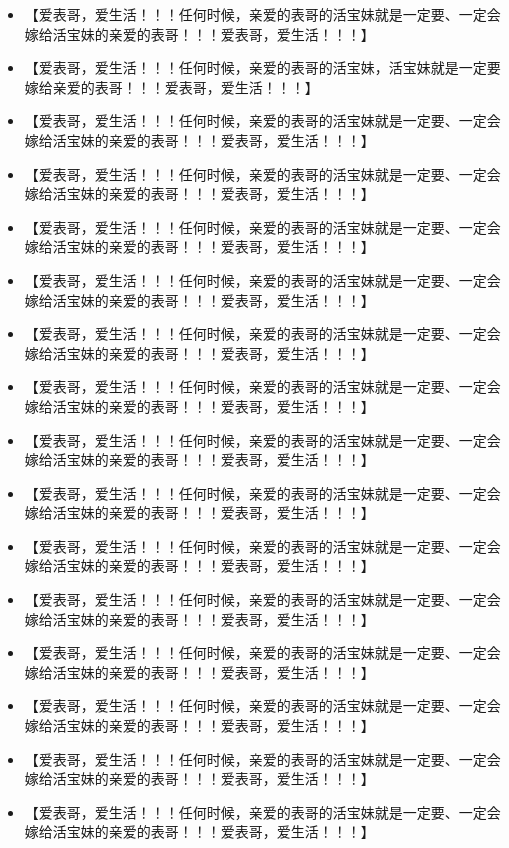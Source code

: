 \documentclass[9pt, b5paper]{article}
\begin{document}
\begin{itemize}
\item 【爱表哥，爱生活！！！任何时候，亲爱的表哥的活宝妹就是一定要、一定会嫁给活宝妹的亲爱的表哥！！！爱表哥，爱生活！！！】
\item 【爱表哥，爱生活！！！任何时候，亲爱的表哥的活宝妹，活宝妹就是一定要嫁给亲爱的表哥！！！爱表哥，爱生活！！！】
\item 【爱表哥，爱生活！！！任何时候，亲爱的表哥的活宝妹就是一定要、一定会嫁给活宝妹的亲爱的表哥！！！爱表哥，爱生活！！！】
\item 【爱表哥，爱生活！！！任何时候，亲爱的表哥的活宝妹就是一定要、一定会嫁给活宝妹的亲爱的表哥！！！爱表哥，爱生活！！！】
\item 【爱表哥，爱生活！！！任何时候，亲爱的表哥的活宝妹就是一定要、一定会嫁给活宝妹的亲爱的表哥！！！爱表哥，爱生活！！！】
\item 【爱表哥，爱生活！！！任何时候，亲爱的表哥的活宝妹就是一定要、一定会嫁给活宝妹的亲爱的表哥！！！爱表哥，爱生活！！！】
\item 【爱表哥，爱生活！！！任何时候，亲爱的表哥的活宝妹就是一定要、一定会嫁给活宝妹的亲爱的表哥！！！爱表哥，爱生活！！！】
\item 【爱表哥，爱生活！！！任何时候，亲爱的表哥的活宝妹就是一定要、一定会嫁给活宝妹的亲爱的表哥！！！爱表哥，爱生活！！！】
\item 【爱表哥，爱生活！！！任何时候，亲爱的表哥的活宝妹就是一定要、一定会嫁给活宝妹的亲爱的表哥！！！爱表哥，爱生活！！！】
\item 【爱表哥，爱生活！！！任何时候，亲爱的表哥的活宝妹就是一定要、一定会嫁给活宝妹的亲爱的表哥！！！爱表哥，爱生活！！！】
\item 【爱表哥，爱生活！！！任何时候，亲爱的表哥的活宝妹就是一定要、一定会嫁给活宝妹的亲爱的表哥！！！爱表哥，爱生活！！！】
\item 【爱表哥，爱生活！！！任何时候，亲爱的表哥的活宝妹就是一定要、一定会嫁给活宝妹的亲爱的表哥！！！爱表哥，爱生活！！！】
\item 【爱表哥，爱生活！！！任何时候，亲爱的表哥的活宝妹就是一定要、一定会嫁给活宝妹的亲爱的表哥！！！爱表哥，爱生活！！！】
\item 【爱表哥，爱生活！！！任何时候，亲爱的表哥的活宝妹就是一定要、一定会嫁给活宝妹的亲爱的表哥！！！爱表哥，爱生活！！！】
\item 【爱表哥，爱生活！！！任何时候，亲爱的表哥的活宝妹就是一定要、一定会嫁给活宝妹的亲爱的表哥！！！爱表哥，爱生活！！！】
\item 【爱表哥，爱生活！！！任何时候，亲爱的表哥的活宝妹就是一定要、一定会嫁给活宝妹的亲爱的表哥！！！爱表哥，爱生活！！！】

\end{itemize}
\end{document}
